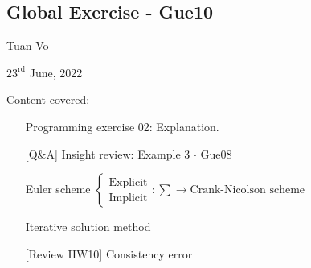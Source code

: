 \documentclass[12pt]{article}
\begin{document}
\begin{center}
	\section*{Global Exercise - Gue10}
\end{center}
\begin{center}
	Tuan Vo
\end{center}
\begin{center}
	$23^{\text{rd}}$ June, 2022
\end{center}
Content covered:
\begin{itemize}
	\item[\checkmark] Programming exercise 02: Explanation.
	\item[\checkmark] [Q\&A] Insight review: Example 3 $\cdot$ Gue08
	\item[\checkmark] Euler scheme
	      $\begin{cases}
			      \text{Explicit} \\
			      \text{Implicit}
		      \end{cases}
		      :
		      \sum
		      \longrightarrow
		      \text{Crank-Nicolson scheme}
	      $
	\item[\checkmark] Iterative solution method
	\item[\checkmark] [Review HW10] Consistency error
\end{itemize}

\end{document}
